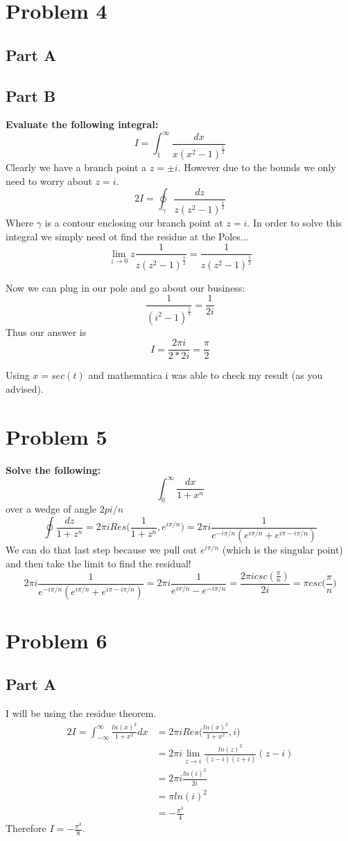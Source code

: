 \documentclass[10pt,a4paper]{article}
\begin{document}
	\section{Problem 4}
	\subsection{Part A}
	\textbf{}
	\subsection{Part B}
	\textbf{Evaluate the following integral:}
	$$I=\int_1^\infty \frac{dx}{x(x^2-1)^\frac{1}{2}}$$
	Clearly we have a branch point a $z=\pm i$. However due to the bounds we only need to worry about $z=i$. 
	$$2I = \oint_\gamma \frac{dz}{z(z^2-1)^\frac{1}{2}}$$
	Where $\gamma$ is a contour enclosing our branch point at $z=i$. In order to solve this integral we simply need ot find the residue at the Poles...
	$$\lim_{z\to 0} z\frac{1}{z(z^2-1)^\frac{1}{2}} = \frac{1}{z(z^2-1)^\frac{1}{2}}$$
	
	Now we can plug in our pole and go about our business:
	$$ \frac{1}{(i^2-1)^\frac{1}{2}} = \frac{1}{2i} $$
	Thus our answer is $$I = \frac{2\pi i}{2*2 i } = \frac{\pi}{2} $$
	
	Using $x=sec(t)$ and mathematica i was able to check my result (as you advised).
	\section{Problem 5}
	\textbf{Solve the following:}
	$$\int_0^\infty \frac{dx}{1+x^n}  $$
	over a wedge of angle $2pi/n$
	$$\oint \frac{dz}{1+z^n} = 2\pi i Res\Big(\frac{1}{1+z^n},e^{i\pi/n}\Big) = 2\pi i \frac{1}{e^{-i \pi/n}(e^{i\pi/n}+e^{i\pi - i\pi/n})} $$
	We can do that last step because we pull out $e^{i\pi/n}$ (which is the singular point) and then take the limit to find the residual!
	$$2\pi i \frac{1}{e^{-i \pi/n}(e^{i\pi/n}+e^{i\pi - i\pi/n})} = 2\pi i \frac{1}{e^{i\pi/n}-e^{-i\pi/n}} = \frac{2\pi icsc(\frac{\pi}{n})}{2i} = \pi csc\Big(\frac{\pi}{n}\Big) $$
	 
	\section{Problem 6}
	\subsection{Part A}
	I will be using the residue theorem.
	\begin{equation}
	\nonumber
	\begin{split}
		2I = \int_{-\infty}^\infty \frac{ln(x)^2}{1+x^2}dx &= 2\pi iRes\Big(\frac{ln(x)^2}{1+x^2},i\Big)\\
		&= 2\pi i \lim\limits_{z\to i}\frac{ln(z)^2}{(z-i)(z+i)}(z-i)\\ 
		&= 2\pi i \frac{ln(i)^2}{2i}\\
		&= \pi ln(i)^2\\
		&= -\frac{\pi^3}{4}
	\end{split}
	\end{equation}
	Therefore $I = -\frac{\pi^3}{8}$.
	
\end{document}
